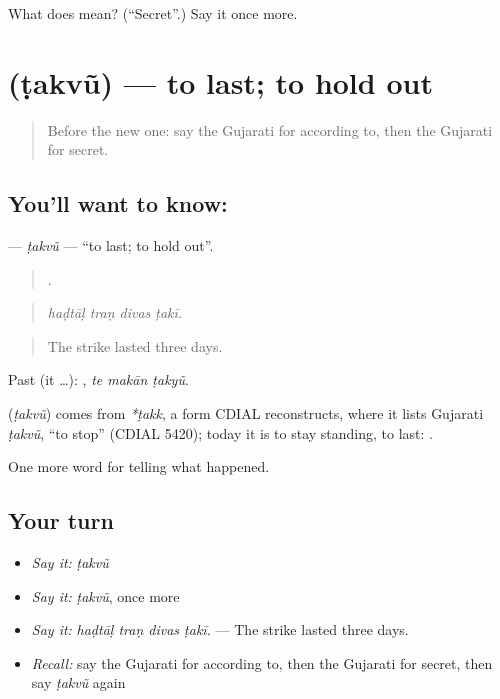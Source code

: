 \begin{tcolorbox}[breakable,colback=teal!4,colframe=teal!35!black,title={Before you move on}]
What does  mean? (\textquotedblleft{}Secret\textquotedblright{}.) Say it once more.
\end{tcolorbox}
\section[\texorpdfstring{\gu{ટકવું} (ṭakvũ)}{ટકવું (ṭakvũ)}]{ (ṭakvũ) — to last; to hold out}

\label{lesson:GU-C316-takvu}



\begin{quote}
Before the new one: say the Gujarati for according to, then the Gujarati for secret.
\end{quote}

\subsection*{You'll want to know: }
\textbf{} — \emph{ṭakvũ} — \textquotedblleft{}to last; to hold out\textquotedblright{}.

\begin{quote}
   .
\end{quote}

\begin{quote}
\emph{haḍtāḷ traṇ divas ṭakī.}
\end{quote}

\begin{quote}
The strike lasted three days.
\end{quote}

Past (it …):   , \emph{te makān ṭakyũ}.

\begin{cousinweb}
\textbf{} (\emph{ṭakvũ}) comes from \emph{*ṭakk}, a form CDIAL reconstructs, where it lists Gujarati \emph{ṭakvũ}, \textquotedblleft{}to stop\textquotedblright{} (CDIAL 5420); today it is to stay standing, to last: \textbf{  }.
\end{cousinweb}

\begin{grammarlens}[title={What you've built}]
One more word for telling what happened.
\end{grammarlens}

\subsection*{Your turn}
\begin{itemize}
\raggedright
  \item \emph{Say it:} \emph{ṭakvũ}
  \item \emph{Say it:} \emph{ṭakvũ}, once more
  \item \emph{Say it:} \emph{haḍtāḷ traṇ divas ṭakī.} — The strike lasted three days.
  \item \emph{Recall:} say the Gujarati for according to, then the Gujarati for secret, then say \emph{ṭakvũ} again
\end{itemize}

